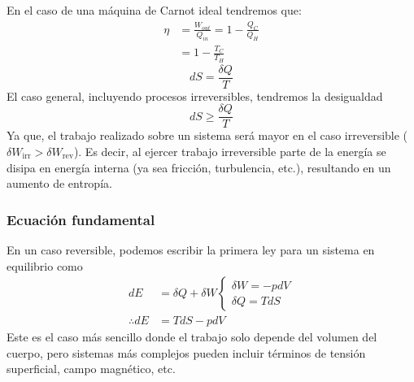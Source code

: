 \documentclass[]{article}
\numberwithin{equation}{section}
\newcommand{\0}{\textcolor{gray}{0}}
\begin{document}
\begin{figure}[h!]
\end{figure}

En el caso de una máquina de Carnot ideal tendremos que:
\begin{align}
	\eta &= \frac{W_{out}}{Q_{in}} = 1-\frac{Q_C}{Q_H}\nonumber\\
	&= 1-\frac{T_C}{T_H}
\end{align}
\begin{equation}
	dS=\frac{\delta Q}{T}
\end{equation}
El caso general, incluyendo procesos irreversibles, tendremos la desigualdad 
\begin{equation}
	dS\geq\frac{\delta Q}{T}
\end{equation}
Ya que, el trabajo realizado sobre un sistema será mayor en el caso irreversible ($\delta W_{\text{irr}}>\delta W_{\text{rev}}$). Es decir, al ejercer trabajo irreversible parte de la energía se disipa en energía interna (ya sea fricción, turbulencia, etc.), resultando en un aumento de entropía.

\subsubsection{Ecuación fundamental}
En un caso reversible, podemos escribir la primera ley para un sistema en equilibrio como
\begin{align}
	dE &= \delta Q + \delta W \left\lbrace \begin{matrix}
		\delta W = -p dV\\
		\delta Q = T dS
	\end{matrix}\right.\nonumber\\
	\therefore dE &= TdS - pdV
	\label{eqn:fund_eqn}
\end{align}
Este es el caso más sencillo donde el trabajo solo depende del volumen del cuerpo, pero sistemas más complejos pueden incluir términos de tensión superficial, campo magnético, etc.
\end{document}
